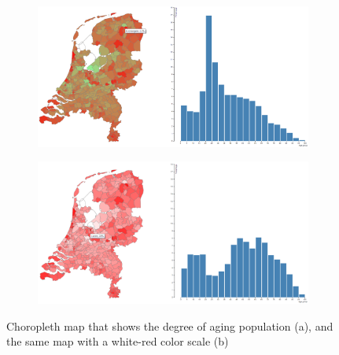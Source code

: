 \begin{figure}[h!]
    \centering
    \captionsetup{justification=centering,margin=0.5cm}
    \begin{subfigure}[t]{0.48\textwidth}
        \includegraphics[width=\textwidth]{img/agemapstudent.png}
        \caption{ }
    \end{subfigure}
    \begin{subfigure}[t]{0.48\textwidth}
        \includegraphics[width=\textwidth]{img/agemapcolor.png}
        \caption{ }
    \end{subfigure}
    \caption{Choropleth map that shows the degree of aging population (a), and the same map with a white-red color scale (b)}
    \label{fig:map}
\end{figure}

